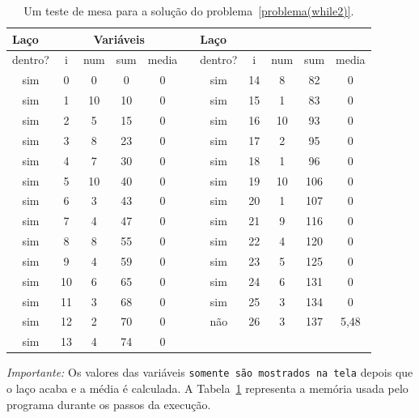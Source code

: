 \begin{table}[h]
\caption{Um teste de mesa para a solução do problema~\ref{problema(while2)}.}
\begin{center}
\begin{tabular}{|c|c|c|c|c|c|c|c|c|c|c|}
\hline
\multicolumn{1}{|l|}{Laço} & \multicolumn{ 4}{c|}{Variáveis} & \multicolumn{1}{l|}{} & \multicolumn{1}{l|}{Laço} & \multicolumn{1}{l|}{} & \multicolumn{1}{l|}{} & \multicolumn{1}{l|}{} & \multicolumn{1}{l|}{} \\ \hline
dentro? & i & num & sum & media &  & dentro? & i & num & sum & media \\ \hline
sim & 0 & 0 & 0 & 0 &  & sim & 14 & 8 & 82 & 0 \\ \hline
sim & 1 & 10 & 10 & 0 &  & sim & 15 & 1 & 83 & 0 \\ \hline
sim & 2 & 5 & 15 & 0 &  & sim & 16 & 10 & 93 & 0 \\ \hline
sim & 3 & 8 & 23 & 0 &  & sim & 17 & 2 & 95 & 0 \\ \hline
sim & 4 & 7 & 30 & 0 &  & sim & 18 & 1 & 96 & 0 \\ \hline
sim & 5 & 10 & 40 & 0 &  & sim & 19 & 10 & 106 & 0 \\ \hline
sim & 6 & 3 & 43 & 0 &  & sim & 20 & 1 & 107 & 0 \\ \hline
sim & 7 & 4 & 47 & 0 &  & sim & 21 & 9 & 116 & 0 \\ \hline
sim & 8 & 8 & 55 & 0 &  & sim & 22 & 4 & 120 & 0 \\ \hline
sim & 9 & 4 & 59 & 0 &  & sim & 23 & 5 & 125 & 0 \\ \hline
sim & 10 & 6 & 65 & 0 &  & sim & 24 & 6 & 131 & 0 \\ \hline
sim & 11 & 3 & 68 & 0 &  & sim & 25 & 3 & 134 & 0 \\ \hline
sim & 12 & 2 & 70 & 0 &  & não & 26 & 3 & 137 & 5,48 \\ \hline
sim & 13 & 4 & 74 & 0 &  & \multicolumn{1}{l|}{} & \multicolumn{1}{l|}{} & \multicolumn{1}{l|}{} & \multicolumn{1}{l|}{} & \multicolumn{1}{l|}{} \\ \hline
\end{tabular}
\end{center}
\label{tab:testemesa1}
\end{table}

\emph{Importante:} Os valores das variáveis \texttt{somente são mostrados na tela} depois que o laço acaba e a média é calculada. A Tabela~\ref{tab:testemesa1} representa a memória usada pelo programa durante os passos da execução.

